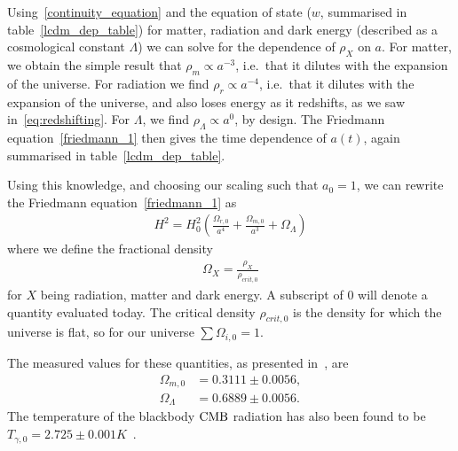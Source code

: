     Using~\eqref{continuity_equation} and the equation of state ($w$, summarised in table~\ref{lcdm_dep_table})
    for matter, radiation and dark energy (described as a cosmological constant $\Lambda$)
    we can solve for the dependence of $\rho_X$ on $a$.
    For matter, we obtain the simple result that $\rho_m\propto a^{-3}$,
    i.e.\ that it dilutes with the expansion of the universe.
    For radiation we find $\rho_r\propto a^{-4}$,
    i.e.\ that it dilutes with the expansion of the universe,
    and also loses energy as it redshifts, as we
    saw in~\eqref{eq:redshifting}.
    For $\Lambda$, we find $\rho_\Lambda\propto a^0$, by design.
    The Friedmann equation~\eqref{friedmann_1} then gives the time dependence of
    $a(t)$, again summarised in table~\ref{lcdm_dep_table}.


    Using this knowledge,
    and choosing our scaling such that $a_0=1$,
    we can rewrite the Friedmann equation~\eqref{friedmann_1} as
    \begin{align}\label{friedmann_omega}
        H^2 = H_0^2\left(\frac{\Omega_{r,0}}{a^4}+\frac{\Omega_{m,0}}{a^3}+\Omega_{\Lambda}\right)
    \end{align}
    where we define the fractional density
    \begin{align}
        \Omega_{X} = \frac{\rho_X}{\rho_{crit,0}}
    \end{align}
    for $X$ being radiation, matter and dark energy.
    A subscript of $0$ will denote a quantity evaluated today.
    The critical density $\rho_{crit,0}$ is the density for which the universe is flat,
    so for our universe $\sum\Omega_{i,0}=1$.


    The measured values for these quantities, as presented in~\cite{Planck_parameters_2018},
    are
    \begin{align}\label{measured_params}
        \Omega_{m,0} &= 0.3111 \pm 0.0056,\\
        \Omega_{\Lambda} &=  0.6889 \pm 0.0056.
    \end{align}
    The temperature of the blackbody $\text{CMB}$ radiation has also been
    found to be $T_{\gamma,0}=2.725\pm0.001K$~\cite{Fixsen_2009}.


